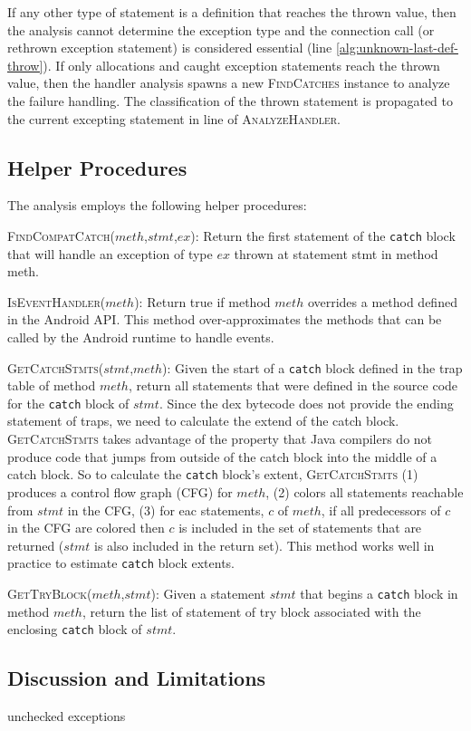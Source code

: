 If any other type of statement is a definition that reaches the thrown
value, then the analysis cannot determine the exception type and the
connection call (or rethrown exception statement) 
is considered essential (line \ref{alg:unknown-last-def-throw}).
If only allocations and caught exception statements reach the thrown
value, then the handler analysis spawns a new \textsc{FindCatches}
instance to analyze the failure handling.  The classification of the
thrown statement is propagated to the current excepting statement in
line \label{alg:progagate-line} of \textsc{AnalyzeHandler}.


\subsection{Helper Procedures}

The analysis employs the following helper procedures: 

\begin{description}[leftmargin=0cm,listparindent=0pt,itemindent=0cm]

\item \textsc{FindCompatCatch}($meth$,$stmt$,$ex$): Return the first
  statement of the \lstinline!catch! block that will handle an
  exception of type $ex$ thrown at statement stmt in method meth.

\item \textsc{IsEventHandler}($meth$): Return true if method $meth$
  overrides a method defined in the Android API.  This method
  over-approximates the methods that can be called by the Android
  runtime to handle events.

\item \textsc{GetCatchStmts}($stmt$,$meth$): Given the start of a
  \lstinline!catch! block defined in the trap table of method $meth$,
  return all statements that were defined in the source code for the
  \lstinline!catch! block of $stmt$.  Since the dex bytecode does not
  provide the ending statement of traps, we need to calculate the
  extend of the catch block.  \textsc{GetCatchStmts} takes advantage
  of the property that Java compilers do not produce code that jumps
  from outside of the catch block into the middle of a catch block.
  So to calculate the \lstinline!catch! block's extent,
  \textsc{GetCatchStmts} (1) produces a control flow graph (CFG) for
  $meth$, (2) colors all statements reachable from $stmt$ in the CFG,
  (3) for eac statements, $c$ of $meth$, if all predecessors of $c$ in
  the CFG are colored then $c$ is included in the set of statements
  that are returned ($stmt$ is also included in the return set). This
  method works well in practice to estimate \lstinline!catch! block
  extents.

\item \textsc{GetTryBlock}($meth$,$stmt$): Given a statement $stmt$
  that begins a \lstinline!catch! block in method $meth$, return the
  list of statement of try block associated with the enclosing
  \lstinline!catch! block of $stmt$.

\end{description}


\subsection{Discussion and Limitations}

unchecked exceptions

